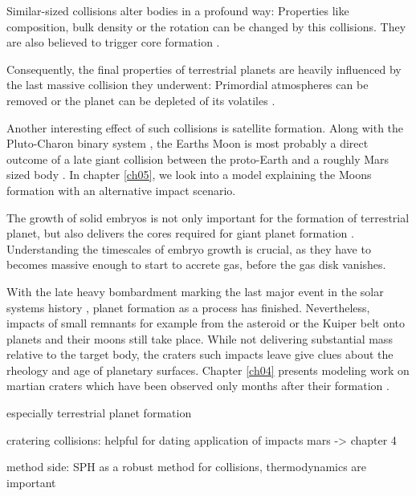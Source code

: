 Similar-sized collisions alter bodies in a profound way: Properties like composition, bulk density \citep{Benz:1988p3336} or the rotation can be changed by this collisions. They are also believed to trigger core formation \cite{1992Icar..100..326T}. 

Consequently, the final properties of terrestrial planets are heavily influenced by the last massive collision they underwent: Primordial atmospheres can be removed \cite{2002DPS....34.2804A} or the planet can be depleted of its volatiles \citep{2001E&PSL.192..545H}.

Another interesting effect of such collisions is satellite formation. Along with the Pluto-Charon binary system \cite{Canup:2005p1987}, the Earths Moon is most probably a direct outcome of a late giant collision between the proto-Earth and a roughly Mars sized body \citep{1975Icar...24..504H, 1976LPI.....7..120C, 1987Icar...71...30B, Canup:2001p1861}. In chapter \ref{ch05}, we look into a model explaining the Moons formation with an alternative impact scenario.

The growth of solid embryos is not only important for the formation of terrestrial planet, but also delivers the cores required for giant planet formation \citep{1996Icar..124...62P}. Understanding the timescales of embryo growth is crucial, as they have to becomes massive enough to start to accrete gas, before the gas disk vanishes. 

With the late heavy bombardment marking the last major event in the solar systems history \citep{2005Natur.435..466G}, planet formation as a process has finished. Nevertheless, impacts of small remnants for example from the asteroid or the Kuiper belt onto planets and their moons still take place. While not delivering substantial mass relative to the target body, the craters such impacts leave give clues about the rheology and age of planetary surfaces. Chapter \ref{ch04} presents modeling work on martian craters which have been observed only months after their formation \cite{2009Sci...325.1674B}. 






especially terrestrial planet formation 

cratering collisions: helpful for dating 
application of impacts mars -> chapter 4


method side: SPH as a robust method for collisions, thermodynamics are important

